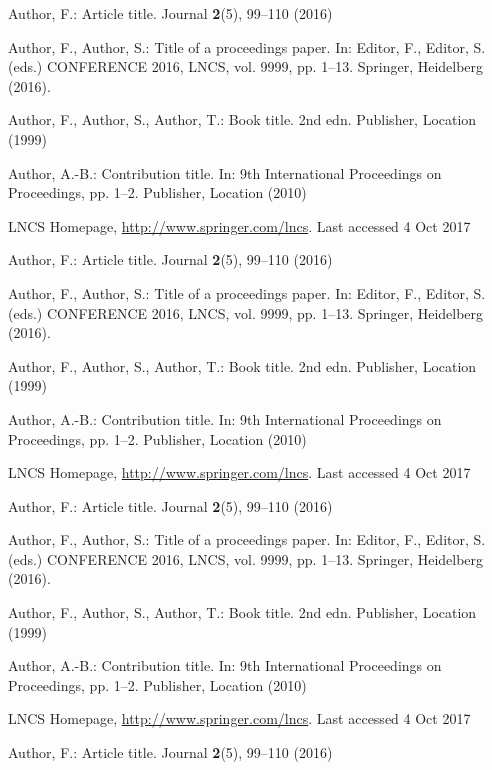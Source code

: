 \documentclass[runningheads]{llncs}
\begin{document}
\begin{thebibliography}{8}
Author, F.: Article title. Journal \textbf{2}(5), 99--110 (2016)

Author, F., Author, S.: Title of a proceedings paper. In: Editor,
F., Editor, S. (eds.) CONFERENCE 2016, LNCS, vol. 9999, pp. 1--13.
Springer, Heidelberg (2016). 

Author, F., Author, S., Author, T.: Book title. 2nd edn. Publisher,
Location (1999)

Author, A.-B.: Contribution title. In: 9th International Proceedings
on Proceedings, pp. 1--2. Publisher, Location (2010)

LNCS Homepage, \url{http://www.springer.com/lncs}. Last accessed 4
Oct 2017

Author, F.: Article title. Journal \textbf{2}(5), 99--110 (2016)

Author, F., Author, S.: Title of a proceedings paper. In: Editor,
F., Editor, S. (eds.) CONFERENCE 2016, LNCS, vol. 9999, pp. 1--13.
Springer, Heidelberg (2016). 

Author, F., Author, S., Author, T.: Book title. 2nd edn. Publisher,
Location (1999)

Author, A.-B.: Contribution title. In: 9th International Proceedings
on Proceedings, pp. 1--2. Publisher, Location (2010)

LNCS Homepage, \url{http://www.springer.com/lncs}. Last accessed 4
Oct 2017

Author, F.: Article title. Journal \textbf{2}(5), 99--110 (2016)

Author, F., Author, S.: Title of a proceedings paper. In: Editor,
F., Editor, S. (eds.) CONFERENCE 2016, LNCS, vol. 9999, pp. 1--13.
Springer, Heidelberg (2016). 

Author, F., Author, S., Author, T.: Book title. 2nd edn. Publisher,
Location (1999)

Author, A.-B.: Contribution title. In: 9th International Proceedings
on Proceedings, pp. 1--2. Publisher, Location (2010)

LNCS Homepage, \url{http://www.springer.com/lncs}. Last accessed 4
Oct 2017

Author, F.: Article title. Journal \textbf{2}(5), 99--110 (2016)


\end{thebibliography}
\end{document}
